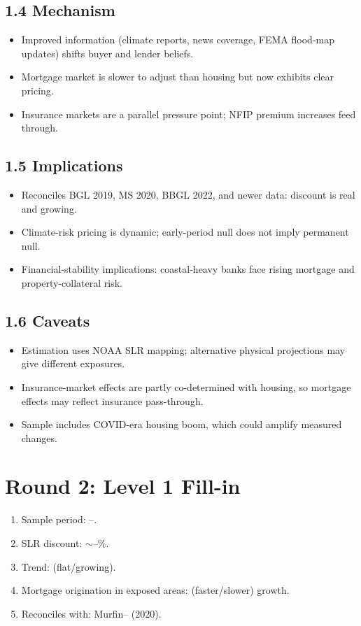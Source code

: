 \documentclass[11pt]{article}
\newcommand{\blank}[1]{\underline{\hspace{#1}}}
\begin{document}
\subsection*{1.4 Mechanism}
\begin{itemize}
\item Improved information (climate reports, news coverage, FEMA flood-map updates) shifts buyer and lender beliefs.
\item Mortgage market is slower to adjust than housing but now exhibits clear pricing.
\item Insurance markets are a parallel pressure point; NFIP premium increases feed through.
\end{itemize}

\subsection*{1.5 Implications}
\begin{itemize}
\item Reconciles BGL 2019, MS 2020, BBGL 2022, and newer data: discount is real and growing.
\item Climate-risk pricing is dynamic; early-period null does not imply permanent null.
\item Financial-stability implications: coastal-heavy banks face rising mortgage and property-collateral risk.
\end{itemize}

\subsection*{1.6 Caveats}
\begin{alertbox}
\begin{itemize}
\item Estimation uses NOAA SLR mapping; alternative physical projections may give different exposures.
\item Insurance-market effects are partly co-determined with housing, so mortgage effects may reflect insurance pass-through.
\item Sample includes COVID-era housing boom, which could amplify measured changes.
\end{itemize}
\end{alertbox}

\section*{Round 2: Level 1 Fill-in}
\begin{enumerate}
\item Sample period: \blank{1cm}--\blank{1cm}.
\item SLR discount: $\sim$\blank{1cm}--\blank{1cm}\%.
\item Trend: \blank{1cm} (flat/growing).
\item Mortgage origination in exposed areas: \blank{1cm} (faster/slower) growth.
\item Reconciles with: Murfin--\blank{1cm} (2020).
\end{enumerate}
\end{document}
